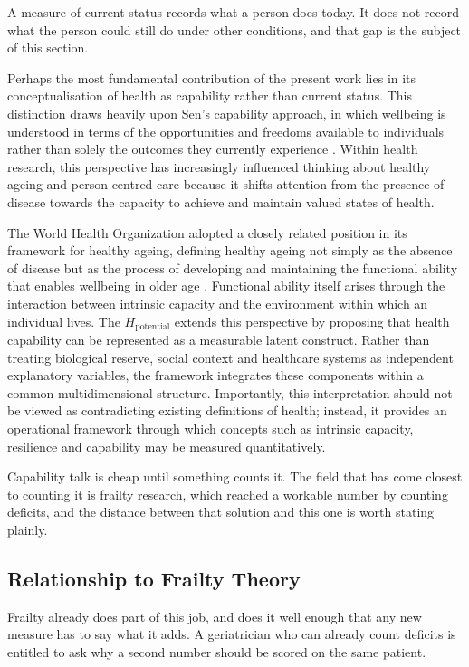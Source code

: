 A measure of current status records what a person does today. It does not
record what the person could still do under other conditions, and that gap is
the subject of this section.

Perhaps the most fundamental contribution of the present work lies in its conceptualisation of health as capability rather than current status. This distinction draws heavily upon Sen's capability approach, in which wellbeing is understood in terms of the opportunities and freedoms available to individuals rather than solely the outcomes they currently experience \citep{sen_1993}. Within health research, this perspective has increasingly influenced thinking about healthy ageing and person-centred care because it shifts attention from the presence of disease towards the capacity to achieve and maintain valued states of health.

The World Health Organization adopted a closely related position in its framework for healthy ageing, defining healthy ageing not simply as the absence of disease but as the process of developing and maintaining the functional ability that enables wellbeing in older age \citep{who_2015_ageing}. Functional ability itself arises through the interaction between intrinsic capacity and the environment within which an individual lives. The $H_{\text{potential}}$ extends this perspective by proposing that health capability can be represented as a measurable latent construct. Rather than treating biological reserve, social context and healthcare systems as independent explanatory variables, the framework integrates these components within a common multidimensional structure. Importantly, this interpretation should not be viewed as contradicting existing definitions of health; instead, it provides an operational framework through which concepts such as intrinsic capacity, resilience and capability may be measured quantitatively.

Capability talk is cheap until something counts it. The field that has come
closest to counting it is frailty research, which reached a workable number by
counting deficits, and the distance between that solution and this one is worth
stating plainly.

\subsection{Relationship to Frailty Theory}
\label{sec:disc-frailty}

Frailty already does part of this job, and does it well enough that any new
measure has to say what it adds. A geriatrician who can already count deficits is
entitled to ask why a second number should be scored on the same patient.

